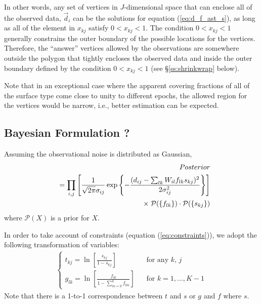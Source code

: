 \documentclass[iop,numberedappendix,apj,]{emulateapj}
\begin{document}
In other words, any set of vertices in $J$-dimensional space that can enclose all of the observed data, $\vec d_i$ can be the solutions for equation (\ref{eq:d_f_ast_s}), as long as all of the element in $x_{kj}$ satisfy $0<x_{kj}<1$. 
The condition $0<x_{kj}<1$ generally constrains the outer boundary of the possible locations for the vertices. 
Therefore, the ``answer'' vertices allowed by the observations are somewhere outside the polygon that tightly encloses the observed data and inside the outer boundary defined by the condition $0<x_{kj}<1$ (see \S\ref{ss:shrinkwrap} below). 

Note that in an exceptional case where the apparent covering fractions of all of the surface type come close to unity to different epochs, the allowed region for the vertices would be narrow, i.e., better estimation can be expected. 


\newpage

\subsection{Bayesian Formulation ?}
\label{ss:regularization}

Assuming the observational noise is distributed as Gaussian, 
\begin{eqnarray}
&&Posterior 
\\ &&= \prod\limits_{i,j}\left[  \frac{1}{\sqrt{2\pi }\sigma_{ij}} \exp \left\{ - \frac{(d_{ij} - \sum _{lk} W_{il} f_{lk} s_{kj})^2}{2 \sigma _{ij}^2} \right\} \right] \notag \\
&& \;\;\;\;\;\;\;\;\;\; \times \; \mathcal{P} (\{f_{lk}\}) \cdot \mathcal{P}(\{s_{kj}\}) 
\end{eqnarray}
where $\mathcal{P} (X) $ is a prior for $X$. 

In order to take account of constraints (equation (\ref{eq:constraints})), we adopt the following transformation of variables: 
\begin{eqnarray}
\begin{cases}
t_{kj} = \displaystyle \ln \left[ \frac{ s_{kj} }{1 - s_{kj} } \right]  \;\;\; & \mbox{for any $k$, $j$} \\
g_{lk} = \displaystyle \ln \left[ \frac{ f_{lk} }{1 - \sum _{m=0}^{k} f_{lm} } \right] \;\;\; & \mbox{for $k=1, ..., K-1$} %
\end{cases}
\end{eqnarray}
Note that there is a 1-to-1 correspondence between $t$ and $s$ or $g$ and $f$ where $s$. 
\end{document}
